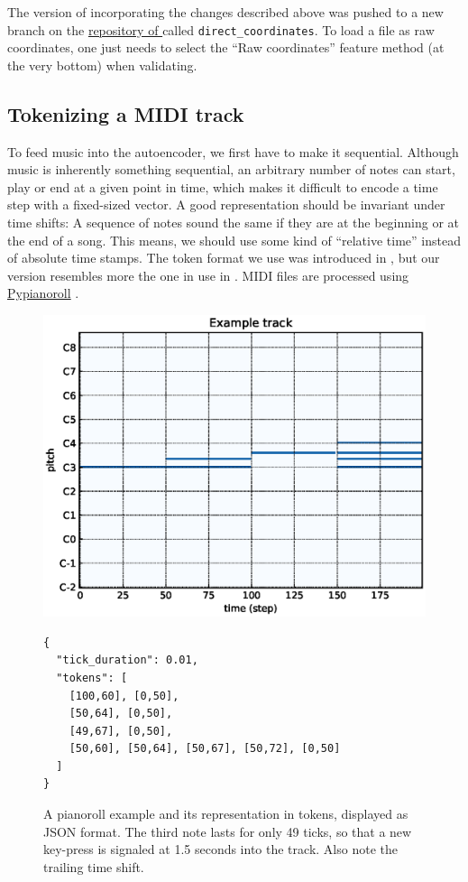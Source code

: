 \documentclass[a4paper]{article}
\newcommand{\agct}{{\usefont{OT1}{phv}{bc}{n}{AGCT}}}
\begin{document}
The version of \agct{} incorporating the changes described above was pushed to a new branch on the \href{https://github.com/agct2019/agct/}{repository of \agct{}} called \texttt{direct\_coordinates}. To load a file as raw coordinates, one just needs to select the ``Raw coordinates'' feature method (at the very bottom) when validating.

\subsection{Tokenizing a MIDI track}
To feed music into the autoencoder, we first have to make it sequential. Although music is inherently something sequential, an arbitrary number of notes can start, play or end at a given point in time, which makes it difficult to encode a time step with a fixed-sized vector. A good representation should be invariant under time shifts: A sequence of notes sound the same if they are at the beginning or at the end of a song. This means, we should use some kind of ``relative time'' instead of absolute time stamps. The token format we use was introduced in \cite{huang2018music}, but our version resembles more the one in use in \cite{topirceanu2014musenet}. MIDI files are processed using \href{https://salu133445.github.io/pypianoroll/index.html}{Pypianoroll} \cite{dong2018pypianoroll}.


\begin{figure}[h!]
  \includegraphics[width=\textwidth]{tokens/example}
  \begin{verbatim}
{
  "tick_duration": 0.01,
  "tokens": [
    [100,60], [0,50],
    [50,64], [0,50],
    [49,67], [0,50],
    [50,60], [50,64], [50,67], [50,72], [0,50]
  ]
}
  \end{verbatim}
  \caption{A pianoroll example and its representation in tokens, displayed as JSON format. The third note lasts for only 49 ticks, so that a new key-press is signaled at 1.5 seconds into the track. Also note the trailing time shift.}
  \label{tokens-example}
\end{figure}
\end{document}
